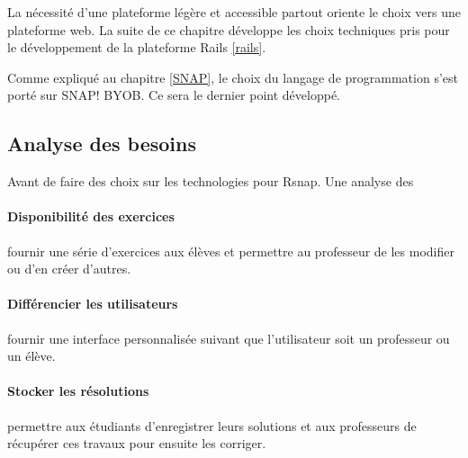 La nécessité d'une plateforme légère et accessible partout oriente le choix vers une plateforme web. La suite de ce chapitre développe les choix techniques pris pour le développement de la plateforme Rails \ref{rails}. 

Comme expliqué au chapitre \ref{SNAP}, le choix du langage de programmation s'est porté sur SNAP! BYOB.  Ce sera le dernier point développé.


\subsection{Analyse des besoins} %
Avant de faire des choix sur les technologies pour Rsnap. Une analyse des 

\paragraph{Disponibilité des exercices} fournir une série d'exercices aux élèves et permettre au professeur de les modifier ou d'en créer d'autres.
\paragraph{Différencier les utilisateurs} fournir une interface personnalisée suivant que l'utilisateur soit un professeur ou un élève.
\paragraph{Stocker les résolutions} permettre aux étudiants d'enregistrer leurs solutions et aux professeurs de récupérer ces travaux pour ensuite les corriger.
